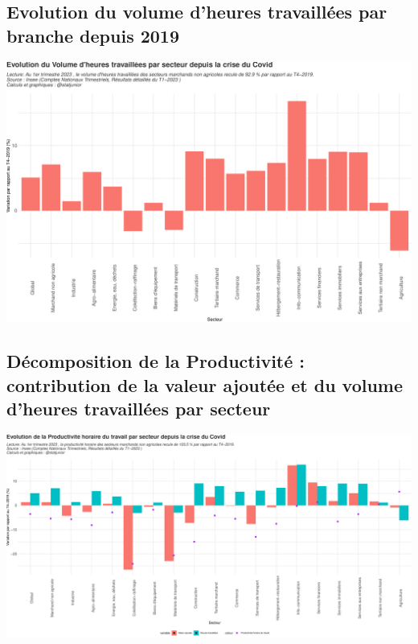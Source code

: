 \documentclass[
  paper=a4,
  ,captions=tableheading
]{scrartcl}
\begin{document}
\hypertarget{evolution-du-volume-dheures-travailluxe9es-par-branche-depuis-2019}{%
\subsection{Evolution du volume d'heures travaillées par branche depuis
2019}\label{evolution-du-volume-dheures-travailluxe9es-par-branche-depuis-2019}}

\includegraphics{rapport_pdf_compte_branche_files/figure-latex/unnamed-chunk-18-1.pdf}

\hypertarget{duxe9composition-de-la-productivituxe9-contribution-de-la-valeur-ajoutuxe9e-et-du-volume-dheures-travailluxe9es-par-secteur}{%
\subsection{Décomposition de la Productivité : contribution de la valeur
ajoutée et du volume d'heures travaillées par
secteur}\label{duxe9composition-de-la-productivituxe9-contribution-de-la-valeur-ajoutuxe9e-et-du-volume-dheures-travailluxe9es-par-secteur}}

\includegraphics{rapport_pdf_compte_branche_files/figure-latex/unnamed-chunk-19-1.pdf}
\end{document}

